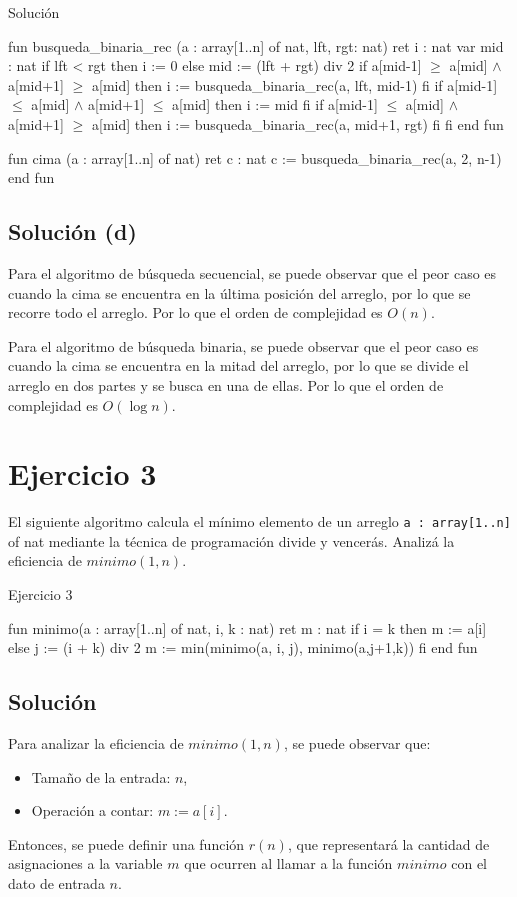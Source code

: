 \begin{codebox}{Solución}
\begin{pascallike}
fun busqueda_binaria_rec (a : array[1..n] of nat, lft, rgt: nat) ret i : nat
var mid : nat
if lft < rgt then
    i := 0
else
    mid := (lft + rgt) div 2
    if a[mid-1] $\geq$ a[mid] $\wedge$ a[mid+1] $\geq$ a[mid] then
        i := busqueda_binaria_rec(a, lft, mid-1)
    fi
    if a[mid-1] $\leq$ a[mid] $\wedge$ a[mid+1] $\leq$ a[mid] then
        i := mid
    fi
    if a[mid-1] $\leq$ a[mid] $\wedge$ a[mid+1] $\geq$ a[mid] then
        i := busqueda_binaria_rec(a, mid+1, rgt)
    fi
fi
end fun

fun cima (a : array[1..n] of nat) ret c : nat
    c := busqueda_binaria_rec(a, 2, n-1)
end fun
\end{pascallike}
\end{codebox}

\subsection{Solución (d)}
Para el algoritmo de búsqueda secuencial, se puede observar que el peor caso es cuando la cima se encuentra en la última posición del arreglo, por lo que se recorre todo el arreglo. Por lo que el orden de complejidad es $O(n)$.

Para el algoritmo de búsqueda binaria, se puede observar que el peor caso es cuando la cima se encuentra en la mitad del arreglo, por lo que se divide el arreglo en dos partes y se busca en una de ellas. Por lo que el orden de complejidad es $O(\log n)$.

\section{Ejercicio 3}
El siguiente algoritmo calcula el mínimo elemento de un arreglo \texttt{a : array[1..n]} of nat mediante la técnica de programación divide y vencerás. Analizá la eficiencia de $minimo(1, n)$.

\begin{codebox}{Ejercicio 3}
\begin{pascallike}
fun minimo(a : array[1..n] of nat, i, k : nat) ret m : nat
    if i = k then m := a[i]
    else 
        j := (i + k) div 2
        m := min(minimo(a, i, j), minimo(a,j+1,k))
    fi
end fun
\end{pascallike}
\end{codebox}

\subsection{Solución}
Para analizar la eficiencia de $minimo(1, n)$, se puede observar que:
\begin{itemize}
    \item Tamaño de la entrada: $n$,
    \item Operación a contar: $m := a[i]$.
\end{itemize}
Entonces, se puede definir una función $r(n)$, que representará la cantidad de asignaciones a la variable $m$ que ocurren al llamar a la función $minimo$ con el dato de entrada $n$.

